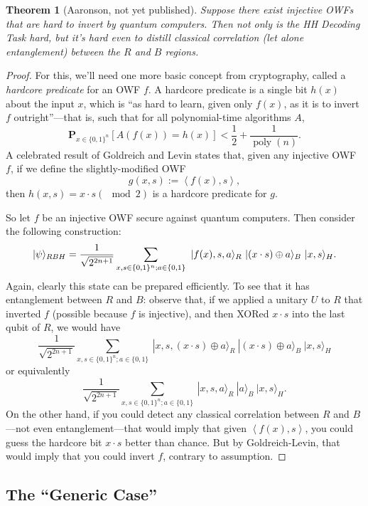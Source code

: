 \documentclass[12pt]{report}
\theoremstyle{plain}
\newtheorem{theorem}{Theorem}[section]
\theoremstyle{definition}
\renewcommand{\Pr}{\mathbf{P}}
\renewcommand{\ket}[1]{|#1\rangle}
\begin{document}
\begin{theorem}[Aaronson, not yet published]
Suppose there exist injective OWFs that are hard to invert by quantum computers.  Then not only is the HH Decoding Task hard, but it's hard even to distill
{\em classical correlation} (let alone entanglement) between the $R$ and $B$ regions.
\end{theorem}
\begin{proof}
For this, we'll need one more basic concept from cryptography, called
a {\em hardcore predicate} for an OWF $f$.  A hardcore predicate is a single bit $h(x)$ about the input $x$, which is ``as hard to learn, given only $f(x)$, as it is to invert $f$ outright''---that is, such that for all polynomial-time algorithms $A$,
$$ \Pr_{x\in \{0,1\}^n }[ A(f(x))=h(x) ] < \frac{1}{2} + \frac{1}{\operatorname*{poly}(n)}.$$
A celebrated result of Goldreich and Levin \cite{GL89} states that, given any injective OWF $f$, if we define the slightly-modified OWF
$$ g(x,s) := \left\langle f(x),s \right\rangle, $$
then $h(x,s) = x \cdot s (\mod 2)$ is a hardcore predicate for $g$.

So let $f$ be an injective OWF secure against quantum computers.  Then consider the following construction:
$$ \ket{\psi}_{RBH} = {1\over\sqrt{2^{2n+1}}} \sum_{x,s \in \{0,1\}^n; a\in \{0,1\}} \ \ket{f(x),s,a}_R \  \ket{(x\cdot s) \oplus a}_B \ \ket{x,s}_H. $$
Again, clearly this state can be prepared efficiently.  To see that it has entanglement between $R$ and $B$: observe that, if we applied a unitary $U$ to $R$ that inverted $f$ (possible because $f$ is injective), and then XORed $x\cdot s$ into the last qubit of $R$, we would have
$$ \frac{1}{\sqrt{2^{2n+1}}} \sum_{x,s \in \{0,1\}^n; a\in \{0,1\}} \ \ket{x,s,(x\cdot s) \oplus a}_R \  \ket{(x\cdot s) \oplus a}_B \ \ket{x,s}_H $$
or equivalently
$$ \frac{1}{\sqrt{2^{2n+1}}} \sum_{x,s \in \{0,1\}^n; a\in \{0,1\}} \ \ket{x,s,a}_R \  \ket{a}_B \ \ket{x,s}_H. $$
On the other hand, if you could detect any classical correlation between $R$ and $B$---not even entanglement---that would imply that given $\left\langle f(x),s \right\rangle$, you could guess the hardcore bit $x\cdot s$ better than chance.  But by Goldreich-Levin, that would imply that you could invert $f$, contrary to assumption.
\end{proof}

\subsection{The ``Generic Case''}
\label{ITSWORSE}
\end{document}
